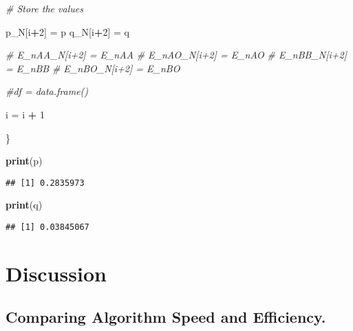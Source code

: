 \documentclass[]{article}
\newenvironment{Shaded}{\begin{snugshade}}{\end{snugshade}}
\newcommand{\KeywordTok}[1]{\textcolor[rgb]{0.13,0.29,0.53}{\textbf{#1}}}
\newcommand{\DecValTok}[1]{\textcolor[rgb]{0.00,0.00,0.81}{#1}}
\newcommand{\StringTok}[1]{\textcolor[rgb]{0.31,0.60,0.02}{#1}}
\newcommand{\CommentTok}[1]{\textcolor[rgb]{0.56,0.35,0.01}{\textit{#1}}}
\newcommand{\OperatorTok}[1]{\textcolor[rgb]{0.81,0.36,0.00}{\textbf{#1}}}
\newcommand{\NormalTok}[1]{#1}
\begin{document}
\begin{Shaded}
\begin{Highlighting}[]
        \CommentTok{# Store the values}
        
\NormalTok{        p_N[i}\OperatorTok{+}\DecValTok{2}\NormalTok{] =}\StringTok{ }\NormalTok{p}
\NormalTok{        q_N[i}\OperatorTok{+}\DecValTok{2}\NormalTok{] =}\StringTok{ }\NormalTok{q}
        
        \CommentTok{# E_nAA_N[i+2] = E_nAA}
        \CommentTok{# E_nAO_N[i+2] = E_nAO}
        \CommentTok{# E_nBB_N[i+2] = E_nBB}
        \CommentTok{# E_nBO_N[i+2] = E_nBO}
        
        \CommentTok{#df = data.frame()}
        
\NormalTok{        i =}\StringTok{ }\NormalTok{i }\OperatorTok{+}\StringTok{ }\DecValTok{1}
  
\NormalTok{\}}


\KeywordTok{print}\NormalTok{(p)}
\end{Highlighting}
\end{Shaded}

\begin{verbatim}
## [1] 0.2835973
\end{verbatim}

\begin{Shaded}
\begin{Highlighting}[]
\KeywordTok{print}\NormalTok{(q)}
\end{Highlighting}
\end{Shaded}

\begin{verbatim}
## [1] 0.03845067
\end{verbatim}

\section{Discussion}\label{discussion}

\subsection{Comparing Algorithm Speed and
Efficiency.}\label{comparing-algorithm-speed-and-efficiency.}
\end{document}
